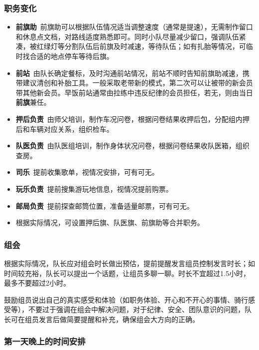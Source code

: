 \documentclass[UTF8]{ctexart}
\begin{document}
\subsubsection{职务变化}

\begin{itemize}[nosep,left=2em]
    \item \textbf{前旗助}\  前旗助可以根据队伍情况适当调整速度（通常是提速），无需制作留口和休息点文档，对路线适度熟悉即可。同时小队尽量减少留口，强调队伍紧凑，被红绿灯等分割队伍后前旗及时减速，等待队伍；如有扎胎等情况，可临时找合适的地点停车等待后旗。
    \item \textbf{前站}\  由队长确定餐标，及时沟通前站情况，前站不顺时告知前旗助减速，携带建议清创和补胎工具。一般采取老带新的模式，第二次可以让被带的新会员带其他新会员。早饭前站通常由拉练中违反纪律的会员担任，若无，则由当日\textbf{前旗}兼任。
    \item \textbf{押后负责}\  由师父培训，制作车况问卷，根据问卷结果收押后包，分配组内押后和车辆对应关系，组织检车。
    \item \textbf{队医负责}\  由队医组培训，制作身体状况问卷，根据问卷结果收队医箱，组织查房。
    \item \textbf{司乐}\  提前收集歌单，视情况安排，可有可无。
    \item \textbf{玩乐负责}\  提前搜集游玩地信息，视情况提前购票。
    \item \textbf{邮局负责}\  提前探查邮筒位置，准备适量邮票，可有可无。
    \item 根据实际情况，可设置押后旗、队医旗、前旗助等合并职务。
\end{itemize}

\subsubsection{组会}

根据实际情况，队长应对组会时长做出预估，提前提醒发言组员控制发言时长；如时间较充裕，队长可以提出一个话题，让组员多聊一聊。时长不宜超过1.5小时，最多不要超过2小时。

鼓励组员说出自己的真实感受和体验（如职务体验、开心和不开心的事情、骑行感受等），不要过于强调在组会中解决问题，对于纪律、安全、团队意识的问题，队长可在组员发言后做简要提醒和补充，确保组会大方向的正确。

\subsubsection{第一天晚上的时间安排}
\end{document}
